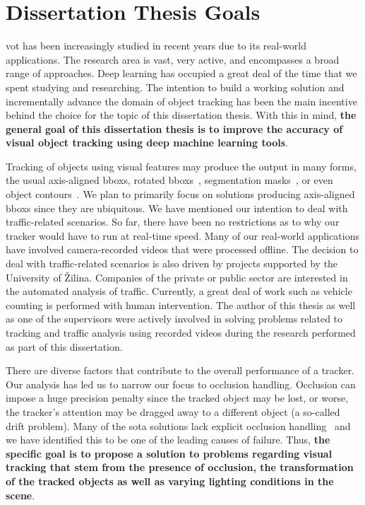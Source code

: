 \chapter{Dissertation Thesis Goals}
\label{chap:Goals}

\Gls{vot} has been increasingly studied in recent years due to its real-world applications. The research area is vast, very active, and encompasses a broad range of approaches. Deep learning has occupied a great deal of the time that we spent studying and researching. The intention to build a working solution and incrementally advance the domain of object tracking has been the main incentive behind the choice for the topic of this dissertation thesis. With this in mind, \textbf{the general goal of this dissertation thesis is to improve the accuracy of visual object tracking using deep machine learning tools}.

Tracking of objects using visual features may produce the output in many forms, the usual axis-aligned \glspl{bbox}, rotated \glspl{bbox}~\cite{chen2019rotbboxes}, segmentation masks~\cite{wang2019siammask}, or even object contours~\cite{yang2016encoderdecoder}. We plan to primarily focus on solutions producing axis-aligned \glspl{bbox} since they are ubiquitous. We have mentioned our intention to deal with traffic-related scenarios. So far, there have been no restrictions as to why our tracker would have to run at real-time speed. Many of our real-world applications have involved camera-recorded videos that were processed offline. The decision to deal with traffic-related scenarios is also driven by projects supported by the University of Žilina. Companies of the private or public sector are interested in the automated analysis of traffic. Currently, a great deal of work such as vehicle counting is performed with human intervention. The author of this thesis as well as one of the supervisors were actively involved in solving problems related to tracking and traffic analysis using recorded videos during the research performed as part of this dissertation.

There are diverse factors that contribute to the overall performance of a tracker. Our analysis has led us to narrow our focus to occlusion handling. Occlusion can impose a huge precision penalty since the tracked object may be lost, or worse, the tracker's attention may be dragged away to a different object (a so-called drift problem). Many of the \gls{sota} solutions lack explicit occlusion handling~\cite{guo2019siamcar, li2018siamrpn, wang2019siammask} and we have identified this to be one of the leading causes of failure. Thus, \textbf{the specific goal is to propose a solution to problems regarding visual tracking that stem from the presence of occlusion, the transformation of the tracked objects as well as varying lighting conditions in the scene}.

